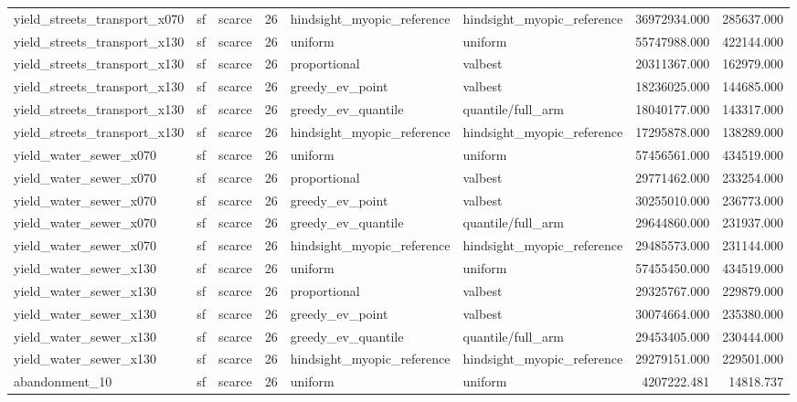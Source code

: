 \begin{tabular}{lllrllrr}
yield\_streets\_transport\_x070 & sf & scarce & 26 & hindsight\_myopic\_reference & hindsight\_myopic\_reference & 36972934.000 & 285637.000 \\
yield\_streets\_transport\_x130 & sf & scarce & 26 & uniform & uniform & 55747988.000 & 422144.000 \\
yield\_streets\_transport\_x130 & sf & scarce & 26 & proportional & valbest & 20311367.000 & 162979.000 \\
yield\_streets\_transport\_x130 & sf & scarce & 26 & greedy\_ev\_point & valbest & 18236025.000 & 144685.000 \\
yield\_streets\_transport\_x130 & sf & scarce & 26 & greedy\_ev\_quantile & quantile/full\_arm & 18040177.000 & 143317.000 \\
yield\_streets\_transport\_x130 & sf & scarce & 26 & hindsight\_myopic\_reference & hindsight\_myopic\_reference & 17295878.000 & 138289.000 \\
yield\_water\_sewer\_x070 & sf & scarce & 26 & uniform & uniform & 57456561.000 & 434519.000 \\
yield\_water\_sewer\_x070 & sf & scarce & 26 & proportional & valbest & 29771462.000 & 233254.000 \\
yield\_water\_sewer\_x070 & sf & scarce & 26 & greedy\_ev\_point & valbest & 30255010.000 & 236773.000 \\
yield\_water\_sewer\_x070 & sf & scarce & 26 & greedy\_ev\_quantile & quantile/full\_arm & 29644860.000 & 231937.000 \\
yield\_water\_sewer\_x070 & sf & scarce & 26 & hindsight\_myopic\_reference & hindsight\_myopic\_reference & 29485573.000 & 231144.000 \\
yield\_water\_sewer\_x130 & sf & scarce & 26 & uniform & uniform & 57455450.000 & 434519.000 \\
yield\_water\_sewer\_x130 & sf & scarce & 26 & proportional & valbest & 29325767.000 & 229879.000 \\
yield\_water\_sewer\_x130 & sf & scarce & 26 & greedy\_ev\_point & valbest & 30074664.000 & 235380.000 \\
yield\_water\_sewer\_x130 & sf & scarce & 26 & greedy\_ev\_quantile & quantile/full\_arm & 29453405.000 & 230444.000 \\
yield\_water\_sewer\_x130 & sf & scarce & 26 & hindsight\_myopic\_reference & hindsight\_myopic\_reference & 29279151.000 & 229501.000 \\
abandonment\_10 & sf & scarce & 26 & uniform & uniform & 4207222.481 & 14818.737 \\

\end{tabular}
